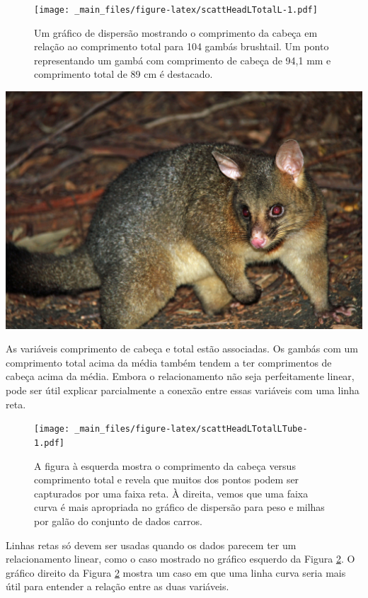 \documentclass[
]{book}
\theoremstyle{definition}
\theoremstyle{definition}
\theoremstyle{definition}
\theoremstyle{definition}
\theoremstyle{remark}
\begin{document}
\begin{figure}
\centering
\texttt{[image: \_main\_files/figure-latex/scattHeadLTotalL-1.pdf]}
\caption{\label{fig:scattHeadLTotalL}Um gráfico de dispersão mostrando o comprimento da cabeça em relação ao comprimento total para 104 gambás brushtail. Um ponto representando um gambá com comprimento de cabeça de 94,1 mm e comprimento total de 89 cm é destacado.}
\end{figure}

\includegraphics[width=72in]{images/c7/brushtail_possum}

As variáveis comprimento de cabeça e total estão associadas. Os gambás com um comprimento total acima da média também tendem a ter comprimentos de cabeça acima da média. Embora o relacionamento não seja perfeitamente linear, pode ser útil explicar parcialmente a conexão entre essas variáveis com uma linha reta.

\begin{figure}
\centering
\texttt{[image: \_main\_files/figure-latex/scattHeadLTotalLTube-1.pdf]}
\caption{\label{fig:scattHeadLTotalLTube}A figura à esquerda mostra o comprimento da cabeça versus comprimento total e revela que muitos dos pontos podem ser capturados por uma faixa reta. À direita, vemos que uma faixa curva é mais apropriada no gráfico de dispersão para peso e milhas por galão do conjunto de dados carros.}
\end{figure}

Linhas retas só devem ser usadas quando os dados parecem ter um relacionamento linear, como o caso mostrado no gráfico esquerdo da Figura \ref{fig:scattHeadLTotalLTube}. O gráfico direito da Figura \ref{fig:scattHeadLTotalLTube} mostra um caso em que uma linha curva seria mais útil para entender a relação entre as duas variáveis.
\end{document}
